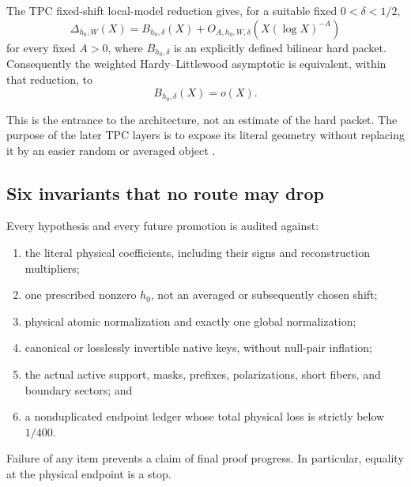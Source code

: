 \begin{proposition}
\label{prop:anchor}
The TPC fixed-shift local-model reduction gives, for a suitable fixed
\(0<\delta<1/2\),
\begin{equation}
\Delta_{h_0,W}(X)
=
B_{h_0,\delta}(X)
+O_{A,h_0,W,\delta}\!\left(X(\log X)^{-A}\right)
\label{eq:hard-packet-anchor}
\end{equation}
for every fixed \(A>0\), where \(B_{h_0,\delta}\) is an explicitly
defined bilinear hard packet.  Consequently the weighted
Hardy--Littlewood asymptotic is equivalent, within that reduction, to
\[
B_{h_0,\delta}(X)=o(X).
\]
\end{proposition}

This is the entrance to the architecture, not an estimate of the hard
packet.  The purpose of the later TPC layers is to expose its literal
geometry without replacing it by an easier random or averaged object
\cite{WangTPC15,WangTPC18}.

\subsection{Six invariants that no route may drop}
\label{subsec:invariants}

Every hypothesis and every future promotion is audited against:
\begin{enumerate}[label=\textbf{I\arabic*.},leftmargin=2.6em]
\item the literal physical coefficients, including their signs and
  reconstruction multipliers;
\item one prescribed nonzero \(h_0\), not an averaged or subsequently
  chosen shift;
\item physical atomic normalization and exactly one global
  normalization;
\item canonical or losslessly invertible native keys, without
  null-pair inflation;
\item the actual active support, masks, prefixes, polarizations, short
  fibers, and boundary sectors; and
\item a nonduplicated endpoint ledger whose total physical loss is
  strictly below \(1/400\).
\end{enumerate}
Failure of any item prevents a claim of final proof progress.  In
particular, equality at the physical endpoint is a stop.
